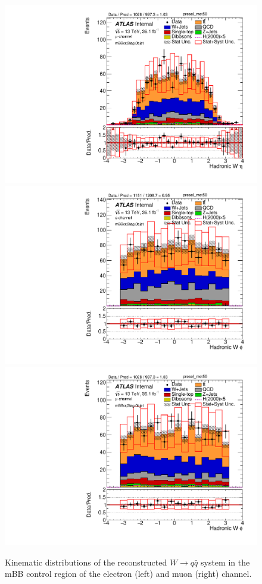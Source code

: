 \begin{figure}[!h]
\begin{center}
\includegraphics[scale=0.33]{./figures/boosted/PlotByChannels/DataMC_2tag_0bjet_mbbcr_muon_presel_met50_WhadEta} 
\includegraphics[scale=0.33]{./figures/boosted/PlotByChannels/DataMC_2tag_0bjet_mbbcr_elec_presel_met50_WhadPhi} 
\includegraphics[scale=0.33]{./figures/boosted/PlotByChannels/DataMC_2tag_0bjet_mbbcr_muon_presel_met50_WhadPhi} 
\caption{Kinematic distributions of the reconstructed $W \to q\bar{q}$ system in the mBB control region of the electron (left) and muon (right) channel.}
\label{fig:boosted_mbbcrleptons_whad}
\end{center}
\end{figure}

